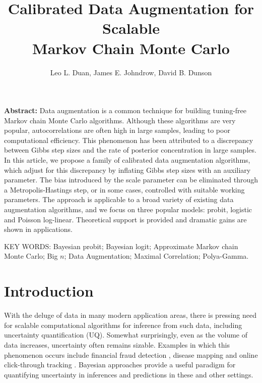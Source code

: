 \documentclass[10pt]{article}
\title
{{Calibrated Data Augmentation for Scalable \\ Markov Chain Monte Carlo}}
\author{
     Leo L. Duan,
     James E. Johndrow,
     David B. Dunson
}
\begin{document}
    
\maketitle

{\bf Abstract:} Data augmentation is a common technique for building tuning-free Markov chain Monte Carlo algorithms. Although these algorithms are very popular, 
autocorrelations are often high in large samples, leading to poor computational efficiency.  This phenomenon has been attributed to a discrepancy between Gibbs step sizes and the rate of posterior concentration in large samples.  In this article, we propose a family of calibrated data augmentation algorithms, which adjust for this discrepancy by inflating Gibbs step sizes with an auxiliary parameter. The bias introduced by the scale parameter can be eliminated through a Metropolis-Hastings step, or in some cases, controlled with suitable working parameters. The approach is applicable to a broad variety of existing data augmentation algorithms, and we focus on three popular models: probit, logistic and Poisson log-linear.  Theoretical support is provided and dramatic gains are shown in applications.
\vskip 12pt

{\noindent  KEY WORDS:  Bayesian probit; Bayesian logit; Approximate Markov chain Monte Carlo; Big $n$; Data Augmentation; Maximal Correlation; Polya-Gamma.}
{}

\section{Introduction}

With the deluge of data in many modern application areas, there is pressing need for scalable computational algorithms for inference from such data, including uncertainty quantification (UQ).  Somewhat surprisingly, even as the volume of data increases, uncertainty often remains sizable.  Examples in which this phenomenon occurs include financial fraud detection \citep{ngai2011application}, disease mapping \citep{wakefield2007disease} and online click-through tracking \citep{wang2010click}.  Bayesian approaches provide a useful paradigm for quantifying uncertainty in inferences and predictions in these and other settings.
\end{document}
